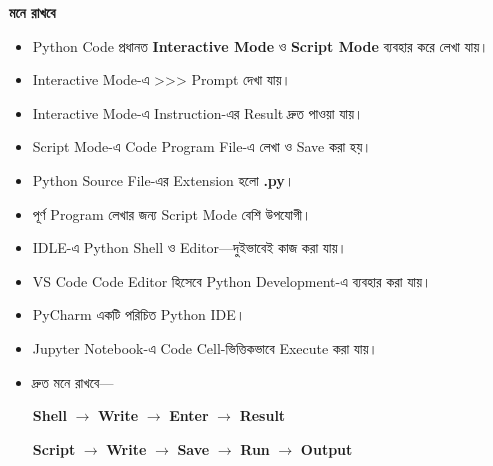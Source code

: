 \begin{rememberbox}

\textbf{\color{deepOrange}মনে রাখবে}

\begin{itemize}

\item
Python Code প্রধানত
\textbf{Interactive Mode}
ও
\textbf{Script Mode}
ব্যবহার করে লেখা যায়।

\item
Interactive Mode-এ
\textenglish{\ttfamily >>>}
Prompt দেখা যায়।

\item
Interactive Mode-এ Instruction-এর Result দ্রুত পাওয়া যায়।

\item
Script Mode-এ Code Program File-এ লেখা ও Save করা হয়।

\item
Python Source File-এর Extension হলো
\textbf{\textenglish{\ttfamily .py}}।

\item
পূর্ণ Program লেখার জন্য Script Mode বেশি উপযোগী।

\item
IDLE-এ Python Shell ও Editor—দুইভাবেই কাজ করা যায়।

\item
VS Code Code Editor হিসেবে Python Development-এ ব্যবহার করা যায়।

\item
PyCharm একটি পরিচিত Python IDE।

\item
Jupyter Notebook-এ Code Cell-ভিত্তিকভাবে Execute করা যায়।

\item
দ্রুত মনে রাখবে—

\begin{center}

\textbf{Shell}
\(\longrightarrow\)
\textbf{Write}
\(\longrightarrow\)
\textbf{Enter}
\(\longrightarrow\)
\textbf{Result}

\medskip

\textbf{Script}
\(\longrightarrow\)
\textbf{Write}
\(\longrightarrow\)
\textbf{Save}
\(\longrightarrow\)
\textbf{Run}
\(\longrightarrow\)
\textbf{Output}

\end{center}

\end{itemize}

\end{rememberbox}

\small


